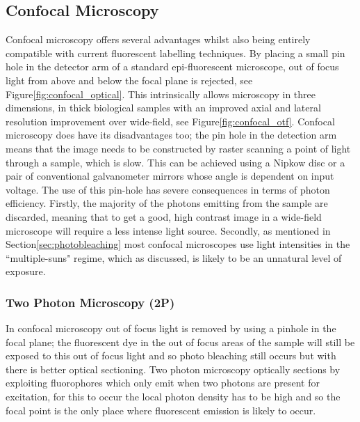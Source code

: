 \subsection{Confocal Microscopy}

Confocal microscopy offers several advantages whilst also being entirely compatible with current fluorescent labelling techniques.
By placing a small pin hole in the detector arm of a standard epi-fluorescent microscope, out of focus light from above and below the focal plane is rejected\cite{Minsky1957}, see Figure\ref{fig:confocal_optical}.
This intrinsically allows microscopy in three dimensions, in thick biological samples with an improved axial and lateral resolution improvement over wide-field\cite{Claxton2006}, see Figure\ref{fig:confocal_otf}.
Confocal microscopy does have its disadvantages too; the pin hole in the detection arm means that the image needs to be constructed by raster scanning a point of light through a sample, which is slow.
This can be achieved using a Nipkow disc or a pair of conventional galvanometer mirrors whose angle is dependent on input voltage.
The use of this pin-hole has severe consequences in terms of photon efficiency.
Firstly, the majority of the photons emitting from the sample are discarded, meaning that to get a good, high contrast image in a wide-field microscope will require a less intense light source.
Secondly, as mentioned in Section\ref{sec:photobleaching} most confocal microscopes use light intensities in the ``multiple-suns" regime\cite{Stelzer2015}, which as discussed, is likely to be an unnatural level of exposure.

\subsubsection{Two Photon Microscopy (2P)}
In confocal microscopy out of focus light is removed by using a pinhole in the focal plane; the fluorescent dye in the out of focus areas of the sample will still be exposed to this out of focus light and so photo bleaching still occurs but with there is better optical sectioning\cite{Helmchen2005}.
Two photon microscopy optically sections by exploiting fluorophores which only emit when two photons are present for excitation, for this to occur the local photon density has to be high and so the focal point is the only place where fluorescent emission is likely to occur.

